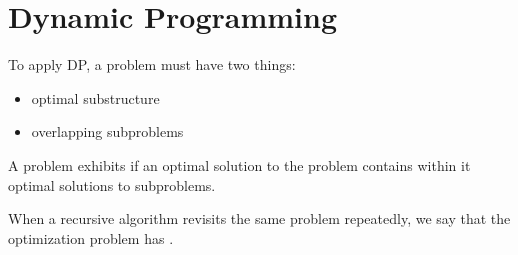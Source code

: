 \chapter{Dynamic Programming}

  \par To apply DP, a problem must have two things:
  \begin{itemize}
    \item optimal substructure
    \item overlapping subproblems
  \end{itemize}

    \par A problem exhibits  if an optimal solution to
      the problem contains within it optimal solutions to subproblems.

    \par When a recursive algorithm revisits the same problem repeatedly, we
    say that the optimization problem has .
